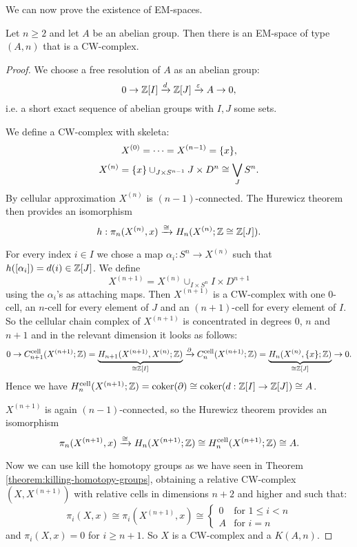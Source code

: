 

We can now prove the existence of EM-spaces.

\begin{theorem}
Let $n\geq2$ and let $A$ be an abelian group. Then there is an EM-space of type $(A,n)$ that is a CW-complex.
\end{theorem}

\begin{proof}
We choose a free resolution of $A$ as an abelian group:
\[0\to{\mathbb Z}[I]\xrightarrow{d}{\mathbb Z}[J]\xrightarrow{\varepsilon}A\to0,\]
i.e. a short exact sequence of abelian groups with $I,J$ some sets.

We define a CW-complex with skeleta:
\[X^{(0)}=\cdots=X^{({n-1})}=\{x\},\]
\[X^{(n)}=\{x\}\cup_{J\times S^{n-1}}J\times D^n\cong\bigvee_J S^n.\]
By cellular approximation $X^{(n)}$ is $(n-1)$-connected. The Hurewicz theorem then provides an isomorphism
\[h:\pi_n(X^{(n)},x)\xrightarrow{\cong}H_n(X^{(n)};{\mathbb Z}\cong{\mathbb Z}[J]).\]

For every index $i\in I$ we chose a map $\alpha_i:S^n\to X^{(n)}$ such that $h([\alpha_i])=d(i)\in{\mathbb Z}[J]$. We define
\[X^{(n+1)}=X^{(n)}\cup_{I\times S^n}I\times D^{n+1}\]
using the $\alpha_i$'s as attaching maps. Then $X^{(n+1)}$ is a CW-complex with one $0$-cell, an $n$-cell for every element of $J$ and an $(n+1)$-cell for every element of $I$. So the cellular chain complex of $X^{(n+1)}$ is concentrated in degrees $0$, $n$ and $n+1$ and in the relevant dimension it looks as follows:
{\small
\[0\to C^\text{cell}_{n+1}(X^{(n+1)};{\mathbb Z})=\underbrace{H_{n+1}(X^{(n+1)},X^{(n)};{\mathbb Z})}_{\cong{\mathbb Z}[I]}\xrightarrow{\partial}C^\text{cell}_n(X^{(n+1)};{\mathbb Z})=\underbrace{H_n(X^{(n)},\{x\};{\mathbb Z})}_{\cong{\mathbb Z}[J]}\to0.\]}Hence we have $H_n^\text{cell}(X^{(n+1)};{\mathbb Z})=\operatorname{coker}(\partial)\cong\operatorname{coker}(d:{\mathbb Z}[I]\to{\mathbb Z}[J])\cong A$.

$X^{(n+1)}$ is again $(n-1)$-connected, so the Hurewicz theorem provides an isomorphism
\[\pi_n(X^{(n+1)},x)\xrightarrow{\cong}H_n(X^{(n+1)};{\mathbb Z})\cong H^\text{cell}_n(X^{(n+1)};{\mathbb Z})\cong A.\]

Now we can use kill the homotopy groups as we have seen in Theorem \ref{theorem:killing-homotopy-groups}, obtaining a relative CW-complex $(X,X^{(n+1)})$ with relative cells in dimensions $n+2$ and higher and such that:
\[\pi_i(X,x)\cong\pi_i(X^{(n+1)},x)\cong\begin{cases}
0 & \text{for } 1\le i < n\\
A & \text{for } i = n
\end{cases}\]
and $\pi_i(X,x)=0$ for $i\ge n+1$. So $X$ is a CW-complex and a $K(A,n)$.
\end{proof}

